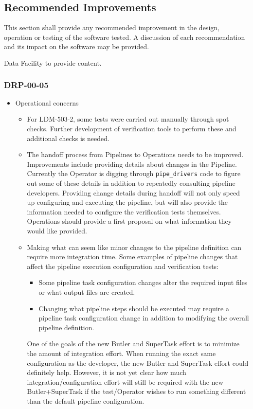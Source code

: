 \documentclass[DM,lsstdraft,STR,toc]{lsstdoc}
\begin{document}
\subsection{Recommended Improvements \label{sect:recommendations}}
This section shall provide any recommended improvement in the design, operation or testing of the software tested. A discussion
of each recommendation and its impact on the software may be provided.

\begin{note}
Data Facility to provide content.
\end{note}

\subsubsection{DRP-00-05}
\begin{itemize}
\item Operational concerns
\begin{itemize}
  \item For LDM-503-2, some tests were carried out manually through 
  spot checks.  Further development of verification tools to perform
  these and additional checks is needed.
  \item The handoff process from Pipelines to Operations needs to
  be improved.  Improvements include providing details about changes
  in the Pipeline.   Currently the Operator is digging through
  \texttt{pipe{\_}drivers} code to figure out some of these details 
  in addition to repeatedly consulting pipeline developers.
  Providing change details during handoff will not only
  speed up configuring and executing the pipeline, but will also
  provide the information needed to configure the verification tests
  themselves.  Operations should provide a first proposal on what
  information they would like provided.

  \item Making what can seem like minor changes to the pipeline
  definition can require more integration time.  Some examples of 
  pipeline changes that affect the pipeline 
  execution configuration and verification tests:
  \begin{itemize}
  \item Some pipeline task configuration changes alter the
      required input files or what output files are created.  
  \item Changing what pipeline steps should be executed 
      may require a pipeline task configuration change in
      addition to modifying the overall pipeline definition.
  \end{itemize}
  One of the goals of the new Butler and SuperTask effort is
  to minimize the amount of integration effort. When running 
  the exact same configuration as the developer, the new 
  Butler and SuperTask effort could 
  definitely help.   However, it is not yet clear how much
  integration/configuration effort will still be required with the
  new Butler+SuperTask if the test/Operator wishes to run 
  something different than the default pipeline configuration.


\end{itemize}
\end{itemize}
\end{document}
